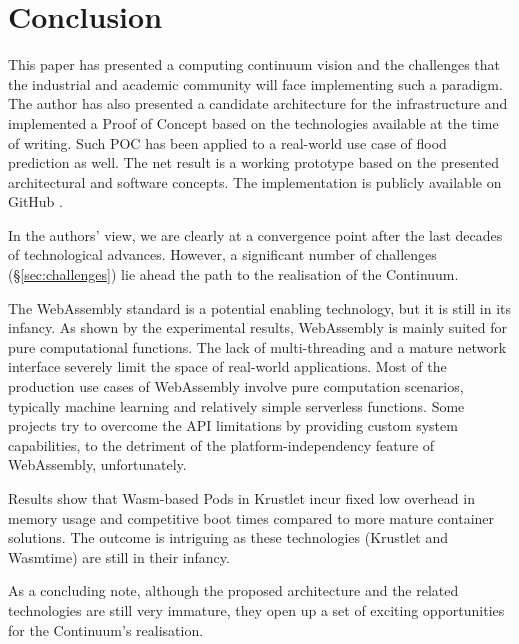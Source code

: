 \section{Conclusion}
\label{sec:conclusion}

This paper has presented a computing continuum vision and the challenges that the industrial and academic community will face implementing such a paradigm. The author has also presented a candidate architecture for the infrastructure and implemented a Proof of Concept based on the technologies available at the time of writing. Such POC has been applied to a real-world use case of flood prediction as well. The net result is a working prototype based on the presented architectural and software concepts. The implementation is publicly available on GitHub \cite{fedra-thesis}. 

In the authors' view, we are clearly at a convergence point after the last decades of technological advances. However, a significant number of challenges (§\ref{sec:challenges}) lie ahead the path to the realisation of the Continuum.

The WebAssembly standard is a potential enabling technology, but it is still in its infancy. As shown by the experimental results, WebAssembly is mainly suited for pure computational functions. The lack of multi-threading and a mature network interface severely limit the space of real-world applications. Most of the production use cases of WebAssembly involve pure computation scenarios, typically machine learning and relatively simple serverless functions. Some projects try to overcome the API limitations by providing custom system capabilities, to the detriment of the platform-independency feature of WebAssembly, unfortunately.

{\color{red}
Results show that Wasm-based Pods in Krustlet incur fixed low overhead in memory usage and competitive boot times compared to more mature container solutions. The outcome is intriguing as these technologies (Krustlet and Wasmtime) are still in their infancy.

As a concluding note, although the proposed architecture and the related technologies are still very immature, they open up a set of exciting opportunities for the Continuum's realisation.
}
